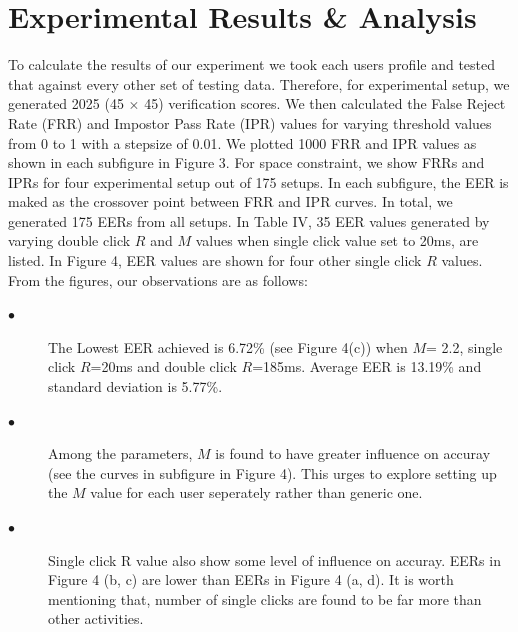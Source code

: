 \documentclass[conference]{IEEEtran}
\begin{document}
\bgroup
{}
\def\arraystretch{1.5}
\egroup




\section{Experimental Results \& Analysis}

To calculate the results of our experiment we took each users profile and tested that against every other set of testing data. Therefore, for experimental setup, we generated 2025 (45 $\times$ 45) verification scores. We then calculated the False Reject Rate (FRR) and Impostor Pass Rate (IPR) values for varying threshold values from 0 to 1 with a stepsize of 0.01. We plotted 1000 FRR and IPR values as shown in each subfigure in Figure 3. For space constraint, we show FRRs and IPRs for four experimental setup out of 175 setups. In each subfigure, the EER is maked as the crossover point between FRR and IPR curves. In total, we generated 175 EERs from all setups. In Table IV, 35 EER values generated by varying double click $R$ and $M$ values when single click value set to 20ms, are listed. In Figure 4, EER values are shown for four other single click $R$ values. From the figures, our observations are as follows:

\begin{description}
  \item[$\bullet$] The Lowest EER achieved is 6.72\% (see Figure 4(c)) when $M$= 2.2, single click $R$=20ms and double click $R$=185ms. Average EER is 13.19\% and standard deviation is 5.77\%. 
  \item[$\bullet$] Among the parameters, $M$ is found to have greater influence on accuray (see the curves in subfigure in Figure 4). This urges to explore setting up the $M$ value for each user seperately rather than generic one.
  \item[$\bullet$] Single click R value also show some level of influence on accuray. EERs in Figure 4 (b, c) are lower than EERs in Figure 4 (a, d). It is worth mentioning that, number of single clicks are found to be far more than other activities.        

\end{description} 
\end{document}
